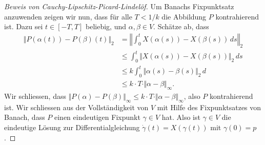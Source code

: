 \documentclass[../main.tex]{subfiles}
\begin{document}
\begin{proof}[Beweis von Cauchy-Lipschitz-Picard-Lindelöf]
  Um Banachs Fixpunktsatz anzuwenden zeigen wir nun,
  dass für alle $T < 1/k$ die Abbildung $P$ kontrahierend ist.
  Dazu sei $t \in [-T, T]$ beliebig,
  und $\alpha, \beta \in V$. Schätze ab, dass
  \begin{align*}
    \Vert P(\alpha(t)) - P(\beta)(t) \Vert_2
    & = \left\Vert \int_{0}^{t} X(\alpha(s)) - X(\beta(s)) \, ds 
    \right\Vert_2\\
    &\leq \int_{0}^{t} \Vert X(\alpha(s)) - X(\beta(s)) \Vert_2 \, ds\\
    &\leq k \int_{0}^{t} \Vert \alpha(s) - \beta(s) \Vert_2 \, d \\
    &\leq k \cdot T \cdot \Vert \alpha - \beta \Vert_{\infty}.
  \end{align*}
  Wir schliessen, dass $\Vert P(\alpha) - P(\beta) \Vert_{\infty}
  \leq k \cdot T \cdot \Vert \alpha - \beta \Vert_{\infty}$,
  also $P$ kontrahierend ist.
  Wir schliessen aus der Vollständigkeit von $V$ 
  mit Hilfe des Fixpunktsatzes von Banach, dass $P$ 
  einen eindeutigen Fixpunkt $\gamma \in V$ hat.
  Also ist $\gamma \in V$ die eindeutige Lösung
  zur Differentialgleichung $\dot \gamma(t) = X(\gamma(t))$ 
  mit $\gamma(0) = p$.
\end{proof}
\end{document}
